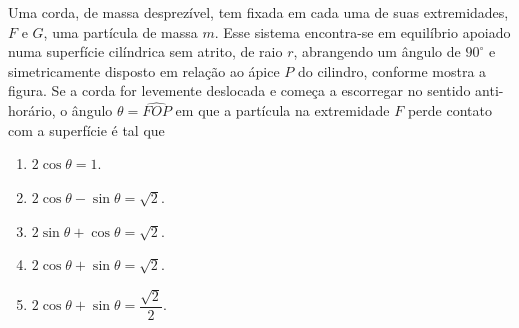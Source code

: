 \vspace{0.3cm}


\begin{exemplo}\label{exemplo_energia_conservacaoenergiamecanica03}

Uma corda, de massa desprezível, tem fixada em cada uma de suas extremidades, $F$ e $G$, uma partícula de massa $m$. 
Esse sistema encontra-se em equilíbrio apoiado numa superfície cilíndrica sem atrito, de raio $r$, abrangendo um ângulo de $90^\circ$ e simetricamente disposto em relação ao ápice $P$ do cilindro, conforme mostra a figura. 
Se a corda for levemente deslocada e começa a escorregar no sentido anti-horário, o ângulo $\theta=\widehat{FOP}$ em que a partícula na extremidade $F$ perde contato com a superfície é tal que

\begin{center}
\end{center}

\begin{enumerate}
    \item [a)] $2\cos\theta = 1$.
    \item [b)] $2\cos\theta - \sin\theta = \sqrt{2}$.
    \item [c)] $2\sin\theta + \cos\theta = \sqrt{2}$.
    \item [d)] $2\cos\theta + \sin\theta = \sqrt{2}$.
    \item [e)] $2\cos\theta + \sin\theta = \dfrac{\sqrt{2}}{2}$.
\end{enumerate}


\end{exemplo}
